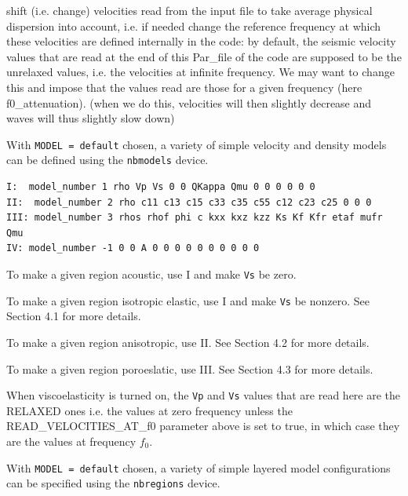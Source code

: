 \documentclass[oneside,english,onecolumn,letterpaper]{book}
\begin{document}
\begin{description}[font=\ttfamily]
\item[READ\_VELOCITIES\_AT\_f0]

 shift (i.e. change) velocities read from the input file to take average physical dispersion into account, i.e. if needed change the reference frequency at which these velocities are defined internally in the code: by default, the seismic velocity values that are read at the end of this Par\_file of the code are supposed to be the unrelaxed values, i.e. the velocities at infinite frequency. We may want to change this and impose that the values read are those for a given frequency (here f0\_attenuation). (when we do this, velocities will then slightly decrease and waves will thus slightly slow down)


\item[nbmodels]  With \texttt{MODEL = default} chosen, a variety of simple velocity and density models can be defined using the \texttt{nbmodels} device.

%
\begin{verbatim}
I:  model_number 1 rho Vp Vs 0 0 QKappa Qmu 0 0 0 0 0 0
II:  model_number 2 rho c11 c13 c15 c33 c35 c55 c12 c23 c25 0 0 0
III: model_number 3 rhos rhof phi c kxx kxz kzz Ks Kf Kfr etaf mufr Qmu
IV: model_number -1 0 0 A 0 0 0 0 0 0 0 0 0 0
\end{verbatim}
%

To make a given region acoustic, use I and make \texttt{Vs} be zero.

To make a given region isotropic elastic, use I and make \texttt{Vs} be nonzero.  See Section 4.1 for more details.

To make a given region anisotropic, use II.  See Section 4.2 for more details.

To make a given region poroeslatic, use III.  See Section 4.3 for more details.

When viscoelasticity is turned on, the \texttt{Vp} and \texttt{Vs} values that are read here are the RELAXED ones i.e. the values at zero frequency
unless the READ\_VELOCITIES\_AT\_f0 parameter above is set to true, in which case they are the values at frequency $f_0$.


\item[nbregions]  With \texttt{MODEL = default} chosen, a variety of simple layered model configurations can be specified using the \texttt{nbregions} device.



\end{description}

\end{document}
